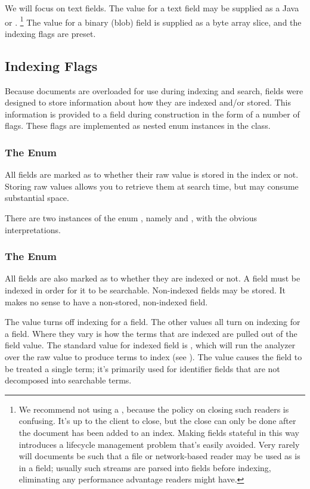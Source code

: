 We will focus on text fields.  The value for a text field may be
supplied as a Java  or .%
%
\footnote{We recommend not using a , because the policy
  on closing such readers is confusing.  It's up to the client to
  close, but the close can only be done after the document has been
  added to an index.  Making fields stateful in this way introduces a
  lifecycle management problem that's easily avoided.  Very rarely
  will documents be such that a file or network-based reader may be
  used as is in a field; usually such streams are parsed into fields
  before indexing, eliminating any performance advantage readers might
  have.}
%
The value for a binary (blob) field is supplied as a byte array slice,
and the indexing flags are preset.


\subsection{Indexing Flags}

Because documents are overloaded for use during indexing and search,
fields were designed to store information about how they are indexed
and/or stored.  This information is provided to a field during
construction in the form of a number of flags.  These flags are
implemented as nested enum instances in the  class.

\subsubsection{The  Enum}

All fields are marked as to whether their raw value is stored in the
index or not.  Storing raw values allows you to retrieve them at
search time, but may consume substantial space.

There are two instances of the enum , namely
 and , with the
obvious interpretations.

\subsubsection{The  Enum}

All fields are also marked as to whether they are indexed or not.  A
field must be indexed in order for it to be searchable.  Non-indexed
fields may be stored.  It makes no sense to have a non-stored,
non-indexed field.

The value  turns off indexing for a field.  The
other values all turn on indexing for a field.  Where they vary is how
the terms that are indexed are pulled out of the field value.  The
standard value for indexed field is , which
will run the analyzer over the raw value to produce terms to index
(see ).  The value
 causes the field to be treated a
single term; it's primarily used for identifier fields that are not
decomposed into searchable terms.

